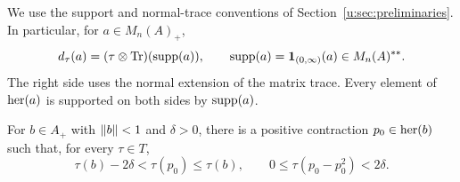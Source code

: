 We use the support and normal-trace conventions of
Section~\ref{u:sec:preliminaries}.  In particular, for $a\in M_n(A)_+$,
\[
 d_\tau(a)=(\tau\otimes\operatorname{Tr})(\operatorname{supp}(a)),
 \qquad \operatorname{supp}(a)=\mathbf 1_{(0,\infty)}(a)\in M_n(A)^{**}.
\]
The right side uses the normal extension of the matrix trace.  Every
element of $\operatorname{her}(a)$ is supported on both sides by $\operatorname{supp}(a)$.

\begin{lemma}
\label{u:lem:almost-projection}
For $b\in A_+$ with $\lVert b\rVert<1$ and $\delta>0$, there is a positive
contraction $p_0\in\operatorname{her}(b)$ such that, for every $\tau\in T$,
\begin{equation}
 \tau(b)-2\delta<\tau(p_0)\le\tau(b),
 \qquad 0\le\tau(p_0-p_0^2)<2\delta.
 \label{u:eq:almost-projection}
\end{equation}
\end{lemma}

